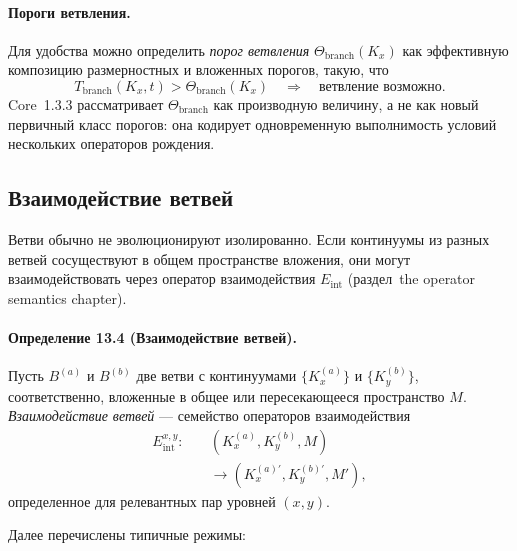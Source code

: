 \paragraph{Пороги ветвления.}
Для удобства можно определить \emph{порог ветвления}
\(\Theta_{\mathrm{branch}}(K_x)\) как эффективную композицию
размерностных и вложенных порогов, такую, что
\[
  T_{\mathrm{branch}}(K_x,t) > \Theta_{\mathrm{branch}}(K_x)
  \quad\Rightarrow\quad
  \text{ветвление возможно.}
\]
Core~1.3.3 рассматривает \(\Theta_{\mathrm{branch}}\) как производную величину,
а не как новый первичный класс порогов: она кодирует одновременную
выполнимость условий нескольких операторов рождения.

\subsection{Взаимодействие ветвей}

Ветви обычно не эволюционируют изолированно. Если континуумы из разных
ветвей сосуществуют в общем пространстве вложения, они могут взаимодействовать
через оператор взаимодействия \(E_{\mathrm{int}}\)
(раздел~the operator semantics chapter).

\paragraph{Определение 13.4 (Взаимодействие ветвей).}
Пусть \(B^{(a)}\) и \(B^{(b)}\) две ветви с континуумами
\(\{K_x^{(a)}\}\) и \(\{K_y^{(b)}\}\), соответственно, вложенные в
общее или пересекающееся пространство \(M\). \emph{Взаимодействие ветвей} —
семейство операторов взаимодействия
\[
\begin{aligned}
  E_{\mathrm{int}}^{x,y}:\quad
    &(K_x^{(a)}, K_y^{(b)}, M)\\
    &\longrightarrow (K_x^{(a)\prime}, K_y^{(b)\prime}, M'),
\end{aligned}
\]
определенное для релевантных пар уровней \((x,y)\).

Далее перечислены типичные режимы:


